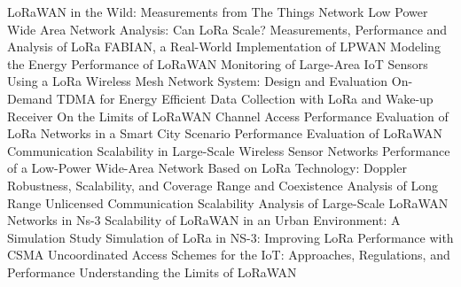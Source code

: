  \cite{blenn_lorawan_2017} {{LoRaWAN}} in the {{Wild}}: {{Measurements}} from {{The Things Network}} \newline 
 \cite{georgiou_low_2017} Low {{Power Wide Area Network Analysis}}: {{Can LoRa Scale}}? \newline 
 \cite{petric_measurements_2016} Measurements, Performance and Analysis of {{LoRa FABIAN}}, a Real-World Implementation of {{LPWAN}} \newline 
 \cite{casals_modeling_2017} Modeling the Energy Performance of {{LoRaWAN}} \newline 
 \cite{lee_monitoring_2018} Monitoring of {{Large}}-{{Area IoT Sensors Using}} a {{LoRa Wireless Mesh Network System}}: {{Design}} and {{Evaluation}} \newline 
 \cite{piyare_-demand_2018} On-{{Demand TDMA}} for {{Energy Efficient Data Collection}} with {{LoRa}} and {{Wake}}-up {{Receiver}} \newline 
 \cite{bankov_limits_2016} On the {{Limits}} of {{LoRaWAN Channel Access}} \newline 
 \cite{magrin_performance_2017} Performance Evaluation of {{LoRa}} Networks in a Smart City Scenario \newline 
 \cite{lavric_performance_2018} Performance Evaluation of {{LoRaWAN}} Communication Scalability in Large-Scale Wireless Sensor Networks \newline 
 \cite{petajajarvi_performance_2017} Performance of a Low-Power Wide-Area Network Based on {{LoRa}} Technology: {{Doppler}} Robustness, Scalability, and Coverage \newline 
 \cite{reynders_range_2016} Range and Coexistence Analysis of Long Range Unlicensed Communication \newline 
 \cite{van_den_abeele_scalability_2017} Scalability {{Analysis}} of {{Large}}-{{Scale LoRaWAN Networks}} in Ns-3 \newline 
 \cite{farhad_scalability_2019} Scalability of {{LoRaWAN}} in an {{Urban Environment}}: {{A Simulation Study}} \newline 
 \cite{to_simulation_2018} Simulation of {{LoRa}} in {{NS}}-3: {{Improving LoRa Performance}} with {{CSMA}} \newline 
 \cite{zucchetto_uncoordinated_2017} Uncoordinated {{Access Schemes}} for the {{IoT}}: {{Approaches}}, {{Regulations}}, and {{Performance}} \newline 
 \cite{adelantado_understanding_2016} Understanding the Limits of {{LoRaWAN}} \newline 
